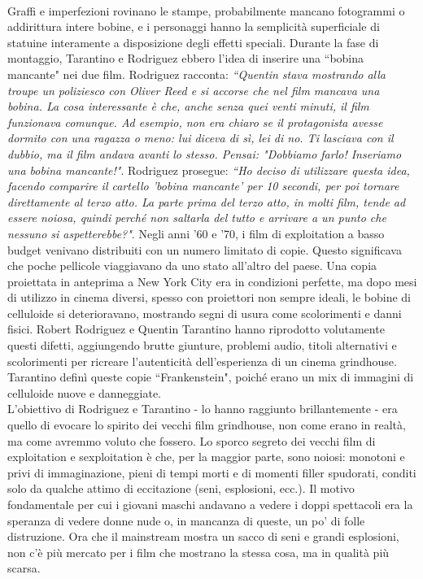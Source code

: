 \documentclass[12pt]{article} %
\begin{document}
\begin{flushleft}
    \\\vspace{1cm} Graffi e imperfezioni rovinano le stampe, probabilmente mancano fotogrammi o addirittura intere bobine, e i personaggi hanno la semplicità superficiale di statuine interamente a disposizione degli effetti speciali. Durante la fase di montaggio, Tarantino e Rodriguez ebbero l’idea di inserire una ``bobina mancante" nei due film. Rodriguez racconta: \textit{``Quentin stava mostrando alla troupe un poliziesco con Oliver Reed e si accorse che nel film mancava una bobina. La cosa interessante è che, anche senza quei venti minuti, il film funzionava comunque. Ad esempio, non era chiaro se il protagonista avesse dormito con una ragazza o meno: lui diceva di sì, lei di no. Ti lasciava con il dubbio, ma il film andava avanti lo stesso. Pensai: "Dobbiamo farlo! Inseriamo una bobina mancante!"}. Rodriguez prosegue: \textit{``Ho deciso di utilizzare questa idea, facendo comparire il cartello 'bobina mancante' per 10 secondi, per poi tornare direttamente al terzo atto. La parte prima del terzo atto, in molti film, tende ad essere noiosa, quindi perché non saltarla del tutto e arrivare a un punto che nessuno si aspetterebbe?"}.
    Negli anni '60 e '70, i film di exploitation a basso budget venivano distribuiti con un numero limitato di copie. Questo significava che poche pellicole viaggiavano da uno stato all'altro del paese. Una copia proiettata in anteprima a New York City era in condizioni perfette, ma dopo mesi di utilizzo in cinema diversi, spesso con proiettori non sempre ideali, le bobine di celluloide si deterioravano, mostrando segni di usura come scolorimenti e danni fisici. Robert Rodriguez e Quentin Tarantino hanno riprodotto volutamente questi difetti, aggiungendo brutte giunture, problemi audio, titoli alternativi e scolorimenti per ricreare l'autenticità dell'esperienza di un cinema grindhouse. Tarantino definì queste copie ``Frankenstein", poiché erano un mix di immagini di celluloide nuove e danneggiate.
    \\\vspace{1cm} L'obiettivo di Rodriguez e Tarantino - lo hanno raggiunto brillantemente - era quello di evocare lo spirito dei vecchi film grindhouse, non come erano in realtà, ma come avremmo voluto che fossero. 
    Lo sporco segreto dei vecchi film di exploitation e sexploitation è che, per la maggior parte, sono noiosi: monotoni e privi di immaginazione, pieni di tempi morti e di momenti filler spudorati, conditi solo da qualche attimo di eccitazione (seni, esplosioni, ecc.). 
    Il motivo fondamentale per cui i giovani maschi andavano a vedere i doppi spettacoli era la speranza di vedere donne nude o, in mancanza di queste, un po' di folle distruzione. Ora che il mainstream mostra un sacco di seni e grandi esplosioni, non c'è più mercato per i film che mostrano la stessa cosa, ma in qualità più scarsa.
\end{flushleft}
\break
\end{document}
